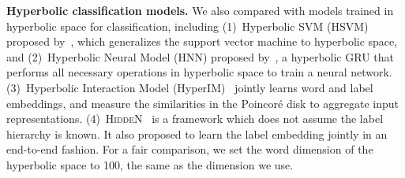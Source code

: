\noindent\textbf{Hyperbolic classification models.}
We also compared with models trained in hyperbolic space for classification, including (1)~Hyperbolic SVM (HSVM) proposed by~\citet{cho2019large}, which
generalizes the support vector machine to hyperbolic space, and (2)~Hyperbolic
Neural Model (HNN) proposed by~\citet{ganea2018hyperbolic}, a hyperbolic GRU that performs all necessary operations in hyperbolic space to train a neural
network. (3)~Hyperbolic Interaction Model (HyperIM)~\cite{chen2020hyperbolic} jointly learns word and label embeddings, and measure the similarities in the Poincor\'{e} disk to aggregate input representations.
(4)~\textsc{HiddeN}~\cite{chatterjee-etal-2021-joint} is a framework which does not assume the label hierarchy is known. It also proposed to learn the label embedding jointly in an end-to-end fashion.
For a fair comparison, we set the word dimension of the hyperbolic 
space to 100, the same as 
the dimension we use.  %

